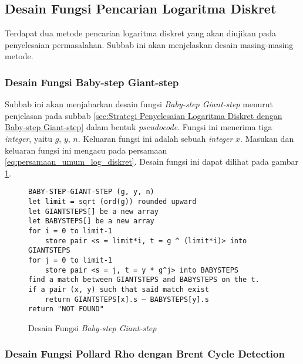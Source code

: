 \subsection{Desain Fungsi Pencarian Logaritma Diskret}

Terdapat dua metode pencarian logaritma diskret yang akan diujikan pada penyelesaian permasalahan. Subbab ini akan menjelaskan desain masing-masing metode.

\subsubsection {Desain Fungsi Baby-step Giant-step}

Subbab ini akan menjabarkan desain fungsi \textit{Baby-step Giant-step} menurut penjelasan pada subbab \ref{sec:Strategi Penyelesaian Logaritma Diskret dengan Baby-step Giant-step} dalam bentuk \textit{pseudocode}. Fungsi ini menerima tiga \textit{integer}, yaitu $ g $, $ y $, $ n $. Keluaran fungsi ini adalah sebuah \textit{integer} $ x $. Masukan dan keluaran fungsi ini mengacu pada persamaan \eqref{eq:persamaan_umum_log_diskret}. Desain fungsi ini dapat dilihat pada gambar \ref{psdo:bsgs}.
\begin{figure}[h!]
\begin{lstlisting}[firstnumber=0]
BABY-STEP-GIANT-STEP (g, y, n)
let limit = sqrt (ord(g)) rounded upward
let GIANTSTEPS[] be a new array
let BABYSTEPS[] be a new array
for i = 0 to limit-1
	store pair <s = limit*i, t = g ^ (limit*i)> into GIANTSTEPS
for j = 0 to limit-1
	store pair <s = j, t = y * g^j> into BABYSTEPS
find a match between GIANTSTEPS and BABYSTEPS on the t.
if a pair (x, y) such that said match exist
	return GIANTSTEPS[x].s – BABYSTEPS[y].s
return "NOT FOUND"
\end{lstlisting}
\caption{Desain Fungsi \textit{Baby-step Giant-step}}
\label{psdo:bsgs}
\end{figure}

\subsubsection {Desain Fungsi Pollard Rho dengan Brent Cycle Detection}

